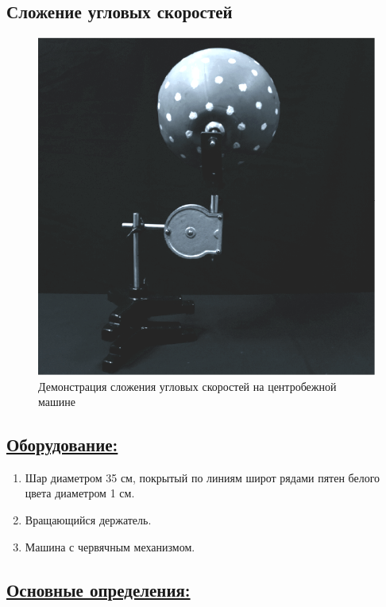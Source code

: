 \documentclass[../main.tex]{subfiles}
\begin{document}

\newpage
\begin{center}
	\subsection*{Сложение угловых скоростей}
\end{center}

\begin{figure}[H] 
	\centering 	
	\includegraphics[width=0.6\linewidth]{angular-1.png}
	\caption{Демонстрация сложения угловых скоростей на центробежной машине}
	\label{angular-1}
\end{figure}

\subsection*{\underline{Оборудование:}}

\begin{enumerate}
	\item Шар диаметром 35 см, покрытый по линиям широт рядами пятен белого цвета диаметром 1 см.
	\item Вращающийся держатель.
	\item Машина с червячным механизмом.
\end{enumerate}

\subsection*{\underline{Основные определения:}}
\end{document}
